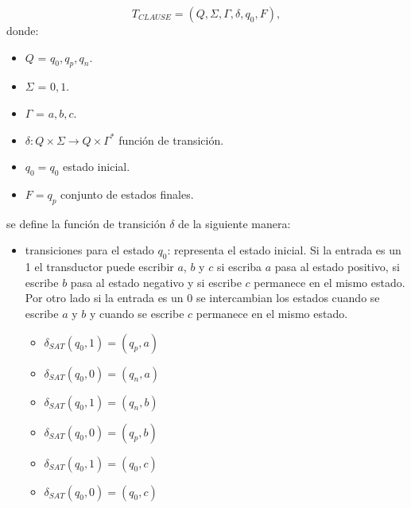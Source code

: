 \[
    T_{CLAUSE} = (Q, {\Sigma}, \Gamma, \delta, q_{0}, F),
\]
donde:
\begin{itemize}
    \item \(Q\) = ${q_0,q_p,q_n}$.
    \item \(\Sigma\) = ${0,1}$.
    \item \(\Gamma\) = ${a,b,c}$.
    \item \(\delta: Q \times \Sigma \to Q \times \Gamma^*\) función de transición.
    \item \(q_{0} = q_0\) estado inicial.
    \item \(F={q_p}\) conjunto de estados finales.
\end{itemize}
se define la función de transición $\delta$ de la siguiente manera:

\begin{itemize}
    \item  transiciones para el estado $q_0$: representa el estado inicial. Si la entrada es un 1 el transductor
          puede escribir $a$, $b$ y $c$ si escriba $a$ pasa al estado positivo, si escribe $b$ pasa al estado negativo
          y si escribe $c$ permanece en el mismo estado. Por otro lado si la entrada es un 0 se intercambian los estados
          cuando se escribe $a$ y $b$ y cuando se escribe $c$ permanece en el mismo estado.

          \begin{multicols}{2}
              \begin{itemize}
                  \item $\delta_{SAT}(q_0,1)=(q_p,a)$
                  \item $\delta_{SAT}(q_0,0)=(q_n,a)$
                  \item $\delta_{SAT}(q_0,1)=(q_n,b)$
                  \item $\delta_{SAT}(q_0,0)=(q_p,b)$
                  \item $\delta_{SAT}(q_0,1)=(q_0,c)$
                  \item $\delta_{SAT}(q_0,0)=(q_0,c)$
              \end{itemize}
          \end{multicols}


\end{itemize}
